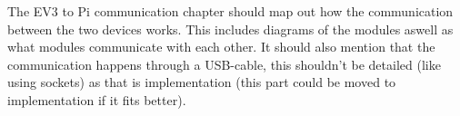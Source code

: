
The EV3 to Pi communication chapter should map out how the communication between the two devices works. 
This includes diagrams of the modules aswell as what modules communicate with each other. 
It should also mention that the communication happens through a USB-cable, 
this shouldn't be detailed (like using sockets) as that is implementation (this part could be moved to implementation if it fits better).